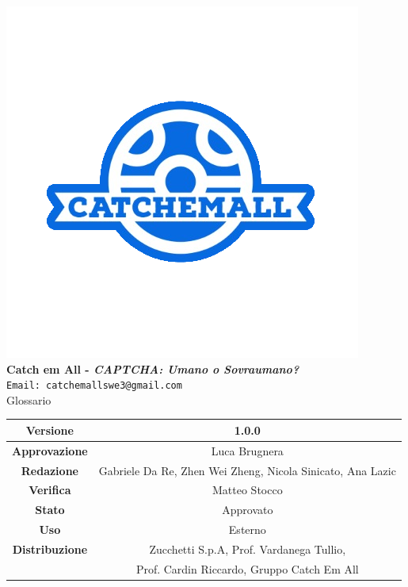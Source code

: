 \begin{titlepage}
\begin{center}
	\includegraphics[scale = 1.5]{img/logo.png}\\
	\bigskip
	\large \textbf{Catch em All - \textit{CAPTCHA: Umano o Sovraumano?}}\\
	\texttt{Email: catchemallswe3@gmail.com}\\
	\vfill
	{\fontsize{1.5cm}{0}\selectfont Glossario}\\
	\vfill
	\setlength\extrarowheight{5pt}
	\begin{tabularx}{\textwidth}{| c | c |}
		\hline
		\textbf{Versione} & 1.0.0\\
		\hline
		\textbf{Approvazione} & Luca Brugnera \\
		\hline
		\textbf{Redazione} & Gabriele Da Re, Zhen Wei Zheng, Nicola Sinicato, Ana Lazic\\
		\hline
		\textbf{Verifica} & Matteo Stocco\\
		\hline
		\textbf{Stato} & Approvato\\
		\hline
		\textbf{Uso} & Esterno\\
		\hline
		\textbf{Distribuzione} & Zucchetti S.p.A, Prof. Vardanega Tullio, \\
		&  Prof. Cardin Riccardo, Gruppo Catch Em All\\
		\hline
	\end{tabularx}
\end{center}
\end{titlepage} 
